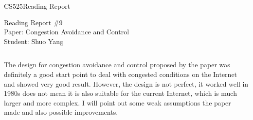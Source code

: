 \documentclass[11pt]{article}
\def\CourseCode{CS525}
\def\ReportNo{9}
\def\Category{Reading Report}
\def\PaperTitle{Congestion Avoidance and Control}
\def\Author{Shuo Yang}
\begin{document}
\noindent

\CourseCode \hfill \Category

\begin{center}
Reading Report \#\ReportNo\\
Paper: \PaperTitle\\
Student: \Author\\
\end{center}

\hrule\smallskip
\vspace{1.5em}

The design for congestion avoidance and control proposed by the paper
was definitely a good start point to deal with congested conditions on
the Internet and showed very good result. However, the design is not
perfect, it worked well in 1980s does not mean it is also suitable for
the current Internet, which is much larger and more complex. I will
point out some weak assumptions the paper made and also possible
improvements.
\end{document}
